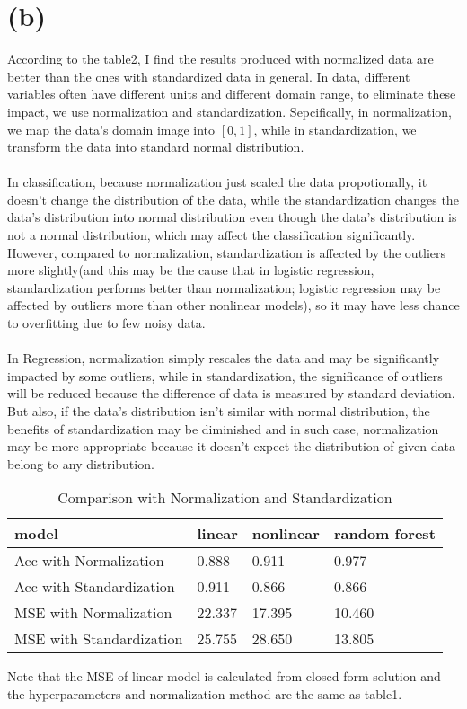 \documentclass[12pt,a4paper]{article}
\begin{document}
\newpage
\section*{(b)}
According to the table2, I find the results produced with normalized data are better than the ones with standardized data in general.
In data, different variables often have different units and different domain range, to eliminate these impact, we use normalization and standardization. Sepcifically, in normalization,
we map the data's domain image into $[0, 1]$, while in standardization, we transform the data into standard normal distribution.\\
\\
In classification, because normalization just scaled the data propotionally, it doesn't change the distribution of the data, while the standardization changes the data's distribution into
normal distribution even though the data's distribution is not a normal distribution, which may affect the classification significantly. However, compared to normalization, standardization is affected by the outliers
more slightly(and this may be the cause that in logistic regression, standardization performs better than normalization; logistic regression may be affected by outliers more than other nonlinear models),
so it may have less chance to overfitting due to few noisy data.\\
\\
In Regression, normalization simply rescales the data and may be significantly impacted by some outliers, while in standardization, the significance of outliers will be reduced because
the difference of data is measured by standard deviation. But also, if the data's distribution isn't similar with normal distribution, the benefits of standardization may be diminished and in such case,
normalization may be more appropriate because it doesn't expect the distribution of given data belong to any distribution.
\begin{table}[htbp]
    \centering
    \caption{Comparison with Normalization and Standardization}
    \label{label2}
    \begin{tabular}[t]{llll}
    \hline
    model & linear & nonlinear & random forest \\
    \hline
    Acc with Normalization& 0.888   & 0.911   & 0.977 \\
    Acc with Standardization& 0.911   & 0.866   & 0.866 \\
    MSE with Normalization& 22.337   & 17.395   & 10.460 \\
    MSE with Standardization& 25.755   & 28.650   & 13.805 \\
    \hline
    \end{tabular}
\end{table}
\begin{center}
Note that the MSE of linear model is calculated from closed form solution and the hyperparameters and normalization method are the same as table1.
\end{center}
\newpage
\end{document}
